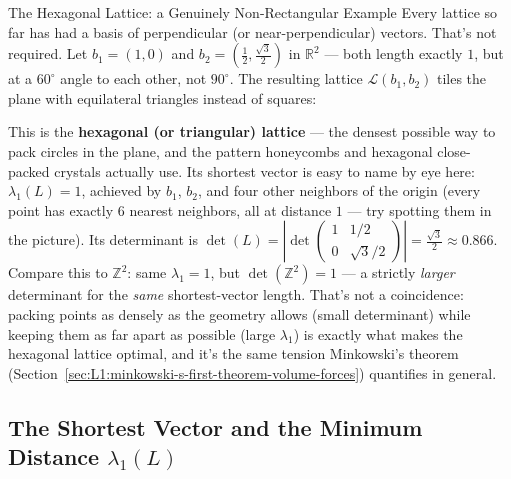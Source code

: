 \begin{exbox}{The Hexagonal Lattice: a Genuinely Non-Rectangular Example}
Every lattice so far has had a basis of perpendicular (or near-perpendicular) vectors. That's not required. Let $b_1 = (1,0)$ and $b_2 = \left(\tfrac12, \tfrac{\sqrt3}{2}\right)$ in $\mathbb{R}^2$ --- both length exactly $1$, but at a $60^\circ$ angle to each other, not $90^\circ$. The resulting lattice $\mathcal{L}(b_1,b_2)$ tiles the plane with equilateral triangles instead of squares:
\begin{center}
\end{center}
This is the \textbf{hexagonal (or triangular) lattice} --- the densest possible way to pack circles in the plane, and the pattern honeycombs and hexagonal close-packed crystals actually use. Its shortest vector is easy to name by eye here: $\lambda_1(L)=1$, achieved by $b_1$, $b_2$, and four other neighbors of the origin (every point has exactly $6$ nearest neighbors, all at distance $1$ --- try spotting them in the picture). Its determinant is $\det(L) = |\det\begin{pmatrix}1 & 1/2 \\ 0 & \sqrt3/2\end{pmatrix}| = \tfrac{\sqrt3}{2} \approx 0.866$. Compare this to $\mathbb{Z}^2$: same $\lambda_1=1$, but $\det(\mathbb{Z}^2)=1$ --- a strictly \emph{larger} determinant for the \emph{same} shortest-vector length. That's not a coincidence: packing points as densely as the geometry allows (small determinant) while keeping them as far apart as possible (large $\lambda_1$) is exactly what makes the hexagonal lattice optimal, and it's the same tension Minkowski's theorem (Section~\ref{sec:L1:minkowski-s-first-theorem-volume-forces}) quantifies in general.
\end{exbox}

\subsection{The Shortest Vector and the Minimum Distance \texorpdfstring{$\lambda_1(L)$}{lambda\_1(L)}}
\label{sec:L1:the-shortest-vector-and-the-minimum-dist}

